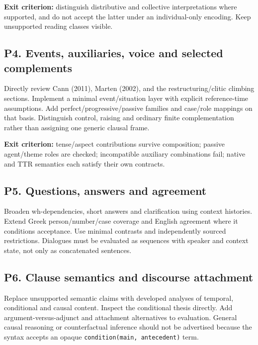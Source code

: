 \documentclass[11pt,a4paper]{article}
\begin{document}
\textbf{Exit criterion:} distinguish distributive and collective
interpretations where supported, and do not accept the latter under an
individual-only encoding. Keep unsupported reading classes visible.

\subsection{P4. Events, auxiliaries, voice and selected
complements}\label{p4.-events-auxiliaries-voice-and-selected-complements}

Directly review Cann (2011), Marten (2002), and the restructuring/clitic
climbing sections. Implement a minimal event/situation layer with
explicit reference-time assumptions. Add perfect/progressive/passive
families and case/role mappings on that basis. Distinguish control,
raising and ordinary finite complementation rather than assigning one
generic clausal frame.

\textbf{Exit criterion:} tense/aspect contributions survive composition;
passive agent/theme roles are checked; incompatible auxiliary
combinations fail; native and TTR semantics each satisfy their own
contracts.

\subsection{P5. Questions, answers and
agreement}\label{p5.-questions-answers-and-agreement}

Broaden wh-dependencies, short answers and clarification using context
histories. Extend Greek person/number/case coverage and English
agreement where it conditions acceptance. Use minimal contrasts and
independently sourced restrictions. Dialogues must be evaluated as
sequences with speaker and context state, not only as concatenated
sentences.

\subsection{P6. Clause semantics and discourse
attachment}\label{p6.-clause-semantics-and-discourse-attachment}

Replace unsupported semantic claims with developed analyses of temporal,
conditional and causal content. Inspect the conditional thesis directly.
Add argument-versus-adjunct and attachment alternatives to evaluation.
General causal reasoning or counterfactual inference should not be
advertised because the syntax accepts an opaque
\texttt{condition(main,\ antecedent)} term.
\end{document}
